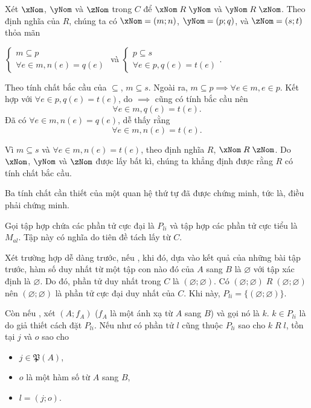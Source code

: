 Xét $\xNom$, $\yNom$ và $\zNom$ trong $C$ để $\xNom\;R\;\yNom$ và $\yNom\;R\;\zNom$. Theo định nghĩa của $R$, chúng ta có $\xNom = (m; n)$, $\yNom = (p; q)$, và $\zNom = (s; t)$ thỏa mãn
\begin{center}
   $\begin{cases}
      m \subseteq p \\
      \forall e \in m, n(e) = q(e)
   \end{cases}$ và $\begin{cases}
      p \subseteq s \\
      \forall e \in p, q(e) = t(e)
   \end{cases}$.
\end{center}
Theo tính chất bắc cầu của $\subseteq$, $m \subseteq s$. Ngoài ra, $m \subseteq p \implies \forall e \in m, e \in p$. Kết hợp với $\forall e \in p, q(e) = t(e)$, do $\implies$ cũng có tính bắc cầu nên
\begin{equation*}
   \forall e \in m, q(e) = t(e).
\end{equation*}
Đã có $\forall e \in m, n(e) = q(e)$, dễ thấy rằng \begin{equation*}
   \forall e \in m, n(e) = t(e).
\end{equation*}

Vì $m \subseteq s$ và $\forall e \in m, n(e) = t(e)$, theo định nghĩa $R$, $\xNom\;R\;\zNom$. Do $\xNom$, $\yNom$ và $\zNom$ được lấy bất kì, chúng ta khẳng định được rằng $R$ có tính chất bắc cầu.

Ba tính chất cần thiết của một quan hệ thứ tự đã được chứng minh, tức là, điều phải chứng minh.

\stepSubexercise Gọi tập hợp chứa các phần tử cực đại là $P_{li}$ và tập hợp các phần tử cực tiểu là $M_{al}$. Tập này có nghĩa do tiên đề tách lấy từ $C$.

Xét trường hợp dễ dàng trước, nếu \coloringCrimson{$\left[\begin{aligned}
   A = \varnothing \\
   B = \varnothing
\end{aligned}\right.$}, khi đó, dựa vào kết quả của những bài tập trước, hàm số duy nhất từ một tập con nào đó của $A$ sang $B$ là $\varnothing$ với tập xác định là $\varnothing$. Do đó, phần tử duy nhất trong $C$ là $(\varnothing; \varnothing)$. Có $(\varnothing; \varnothing)\;R\;(\varnothing; \varnothing)$ nên $(\varnothing; \varnothing)$ là phần tử cực đại duy nhất của $C$. Khi này, 
$P_{li} = \{(\varnothing; \varnothing)\}$.

Còn nếu , xét $(A; f_A)$ ($f_A$ là một ánh xạ từ $A$ sang $B$) và gọi nó là $k$. $k \in P_{li}$ là do giả thiết cách đặt $P_{li}$. Nếu như có phần tử $l$ cũng thuộc $P_{li}$ sao cho $k\;R\;l$, tồn tại $j$ và $o$ sao cho 
\begin{itemize}
   \item $j \in \mathfrak{P}(A)$,
   \item $o$ là một hàm số từ $A$ sang $B$,
   \item $l = (j; o)$.
\end{itemize}

